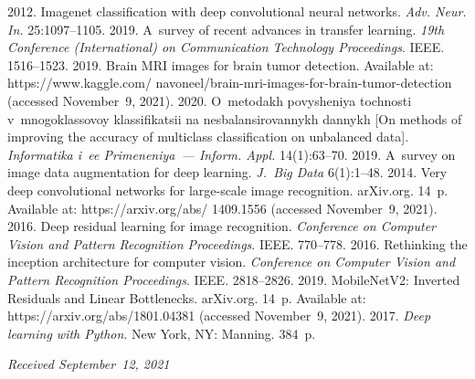 \begin{multicols}{2}
{{\begin{thebibliography}{99}
{}
 2012. Imagenet classification with deep 
convolutional neural networks. \textit{Adv. Neur. In.} 25:1097--1105.
 2019. A~survey of recent advances in transfer learning. 
\textit{19th  Conference (International) on Communication Technology Proceedings}. IEEE. 1516--1523.
 2019. Brain MRI images for brain tumor detection. Available at:  
{\sf https://www.kaggle.com/ navoneel/brain-mri-images-for-brain-tumor-detection} (accessed November~9, 2021).
 2020. O~metodakh povysheniya tochnosti 
v~mnogoklassovoy klassifi\-ka\-tsii na nesbalansirovannykh dannykh [On methods of improving the 
accuracy of multiclass classification on unbalanced data]. \textit{Informatika i~ee Primeneniya~--- Inform. 
Appl.} 14(1):63--70.
 2019. A~survey on image data augmentation for deep 
learning. \textit{J.~Big Data} 6(1):1--48.
 2014. Very deep convolutional networks for large-scale 
image recognition. \mbox{arXiv.org.} 14~p. Available at: 
{\sf https://arxiv.org/abs/ 1409.1556} (accessed November~9, 2021).
 2016. Deep residual learning for image recognition. 
\textit{Conference on Computer Vision and Pattern Recognition Proceedings}. IEEE. 770--778.
 2016. Rethinking the 
inception architecture for computer vision. \textit{Conference on Computer Vision and Pattern 
Recognition Proceedings}. IEEE. 2818--2826.
 2019. MobileNetV2: 
Inverted Residuals and Linear Bottlenecks. arXiv.org. 14~p. Available at: 
{\sf https://arxiv.org/abs/1801.04381} (accessed November~9, 2021).
 2017. \textit{Deep learning with Python}. New York, NY: Manning. 384~p.
\end{thebibliography}

 }
 }

\end{multicols}

\vspace*{-3pt}

  \hfill{\small\textit{Received September~12, 2021}}


